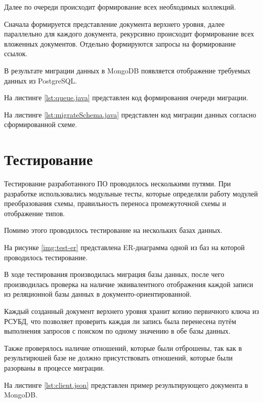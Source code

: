 Далее по очереди происходит формирование всех необходимых коллекций.

Сначала формируется представление документа верхнего уровня, далее параллельно для каждого документа, 
рекурсивно происходит формирование всех вложенных документов. 
Отдельно формируются запросы на формирование ссылок.

В результате миграции данных в MongoDB появляется отображение требуемых данных из PostgreSQL.

На листинге \ref{lst:queue.java} представлен код формирования очереди миграции.

\clearpage

На листинге \ref{lst:migrateSchema.java} представлен код миграции данных согласно сформированной схеме.

\clearpage
\section{Тестирование}
Тестирование разработанного ПО проводилось несколькими путями. 
При разработке использовались модульные тесты, 
которые определяли работу модулей преобразования схемы, правильность переноса промежуточной схемы и отображение типов.

Помимо этого проводилось тестирование на нескольких базах данных.

На рисунке \ref{img:test-er} представлена ER-диаграмма одной из баз на которой проводилось тестирование.


\clearpage

В ходе тестирования производилась миграция базы данных, 
после чего производилась проверка на наличие эквивалентного отображения каждой записи из 
реляционной базы данных в документо-ориентированной.

Каждый созданный документ верхнего уровня хранит копию первичного ключа из РСУБД,
что позволяет проверить каждая ли запись была перенесена путём выполнения запросов 
с поиском по одному значению в обе базы данных.

Также проверялось наличие отношений, которые были отброшены, 
так как в результирюшей базе не должно присутствовать отношений, 
которые были разорваны в процессе миграции.

На листинге \ref{lst:client.json} представлен пример результирующего документа в MongoDB.


